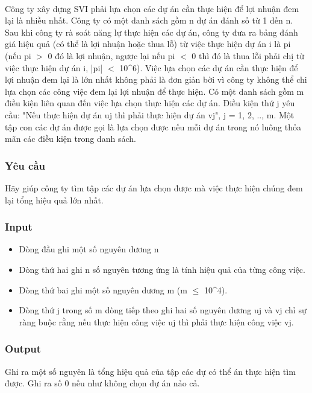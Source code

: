 

 

Công ty xây dựng SVI phải lựa chọn các dự án cần thực hiện để lợi nhuận đem lại là nhiều nhất. Công ty có một danh sách gồm n dự án đánh số từ 1 đến n. Sau khi công ty rà soát năng lự thực hiện các dự án, công ty đưa ra bảng đánh giá hiệu quả (có thể là lợi nhuận hoặc thua lỗ) từ việc thực hiện dự án i là pi (nếu pi $>$ 0 đó là lợi nhuận, ngược lại nếu pi $<$ 0 thì đó là thua lỗi phải chị từ việc thực hiện dự án i, |pi| $<$ 10^6). Việc lựa chọn các dự án cần thực hiện để lợi nhuận đem lại là lớn nhất không phải là đơn giản bời vì công ty không thể chi lựa chọn các công việc đem lại lợi nhuận để thực hiện. Có một danh sách gồm m điều kiện liên quan đến việc lựa chọn thực hiện các dự án. Điều kiện thứ j yêu cầu: "Nếu thực hiện dự án uj thì phải thực hiện dự án vj", j = 1, 2, .., m. Một tập con các dự án được gọi là lựa chọn được nếu mỗi dự án trong nó luông thỏa mãn các điều kiện trong danh sách.

\subsubsection{Yêu cầu}

Hãy giúp công ty tìm tập các dự án lựa chọn được mà việc thực hiện chúng đem lại tổng hiệu quả lớn nhất.

\subsubsection{Input}
\begin{itemize}
	\item Dòng đầu ghi một số nguyên dương n
	\item Dòng thứ hai ghi n số nguyên tương ứng là tính hiệu quả của từng công việc.
	\item Dòng thứ bai ghi một số nguyên dương m (m  $\le$  10^4).
	\item Dòng thứ j trong số m dòng tiếp theo ghi hai số nguyên dương uj và vj chỉ sự ràng buộc rằng nếu thực hiện công việc uj thì phải thực hiện công việc vj.
\end{itemize}

\subsubsection{Output}

Ghi ra một số nguyên là tổng hiệu quả của tập các dự có thể án thực hiện tìm được. Ghi ra số 0 nếu như không chọn dự án nảo cả.

